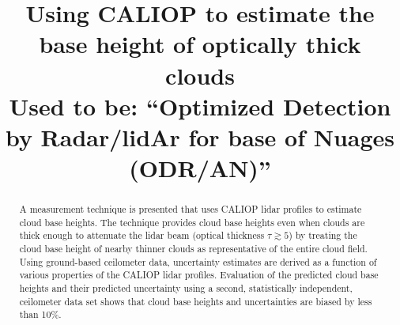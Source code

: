 \documentclass[amt,manuscript]{copernicus}\usepackage[]{graphicx}\usepackage[]{color}
\begin{document}

\title{Using CALIOP to estimate the base height of optically thick clouds\\
Used to be: ``Optimized Detection by Radar/lidAr for base of Nuages (ODR/AN)''}













\received{}
\pubdiscuss{} %
\revised{}
\accepted{}
\published{}




\maketitle



\begin{abstract}
  A measurement technique is presented that uses CALIOP lidar profiles to
  estimate cloud base heights.  The technique provides cloud base heights even
  when clouds are thick enough to attenuate the lidar beam (optical thickness
  $\tau \gtrsim 5$) by treating the cloud base height of nearby thinner clouds as
  representative of the entire cloud field.  Using ground-based ceilometer data,
  uncertainty estimates are derived as a function of various properties of the
  CALIOP lidar profiles.  Evaluation of the predicted cloud base heights and
  their predicted uncertainty using a second, statistically independent,
  ceilometer data set shows that cloud base heights and uncertainties are biased
  by less than 10\%.
\end{abstract}
\end{document}

